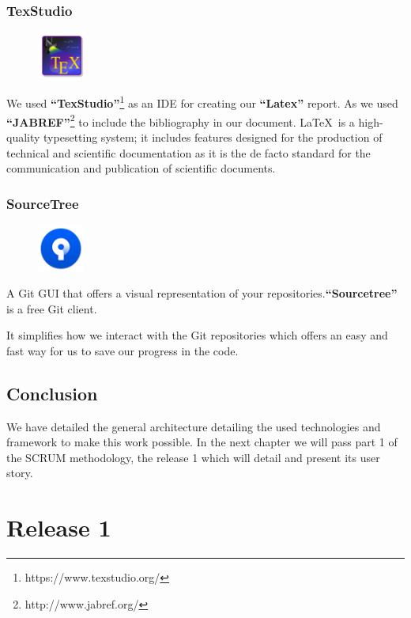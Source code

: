 \documentclass[12pt,a4paper]{report}
\begin{document}
	\subsection{TexStudio}
	\begin{figure}
		\centering
		\includegraphics[width=0.6in]{texstudio.png}
	\end{figure}
	We used \textbf{``TexStudio''}\footnote{https://www.texstudio.org/} as an IDE for creating our \textbf{``Latex''} report. As we used \textbf{``JABREF''}\footnote{http://www.jabref.org/} to include the bibliography in our document. \LaTeX~is a high-quality typesetting system; it includes features designed for the production of technical and scientific documentation as it is the de facto standard for the communication and publication of scientific documents.\cite{latexBook}
	
	\subsection{SourceTree}
	\begin{figure}
		\centering
		\includegraphics[width=0.6in]{sourcetreelogo.png}
	\end{figure}
	A Git GUI that offers a visual representation of your repositories.\textbf{``Sourcetree''}  is a free Git client.\par 
	It simplifies how we interact with the Git repositories which offers an easy and fast way for us to save our progress in the code.
	\section*{Conclusion}
	We have detailed the general architecture detailing the used technologies and framework to make this work possible.
	In the next chapter we will pass part 1 of the SCRUM methodology, the release 1 which will detail and present its user story.
	\chapter{Release 1}
\end{document}
